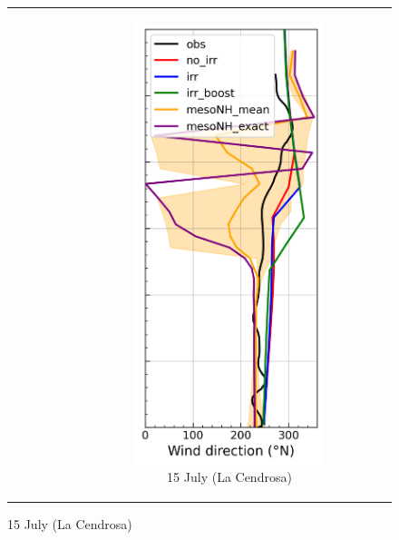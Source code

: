 \begin{figure}[hbtp]
{\begin{tabular}{@{}cccc@{}}
\begin{subfigure}[t]{0.283\textwidth}
        \end{subfigure} &
        \begin{subfigure}[t]{0.283\textwidth}
            \caption{15 July (La Cendrosa)}
            \includegraphics[width=\textwidth]{images/chap5/profiles/profile_cendrosa_wind_direction_1507_.png}

\end{subfigure}
\end{tabular}}
\end{figure}
